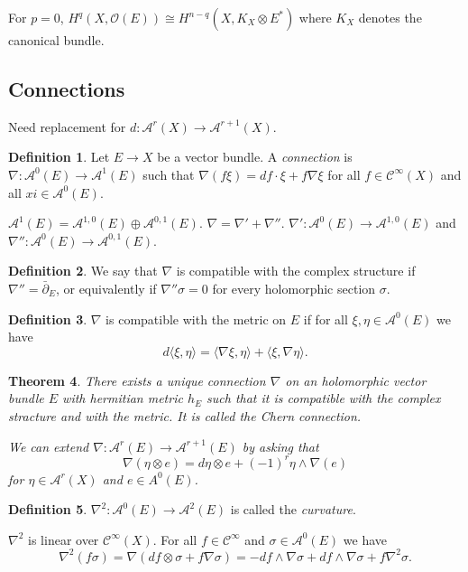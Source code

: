 \documentclass[11pt,A4]{article}
\theoremstyle{plain}
\newtheorem{thm}{Theorem}[section]
\theoremstyle{definition}
\newtheorem{defn}[thm]{Definition}
\theoremstyle{remark}
\newcommand{\1}{\mathbbm{1}}
\newcommand{\A}{\mathscr{A}}
\newcommand{\calC}{\mathcal{C}}
\renewcommand{\O}{\mathcal{O}}
\newcommand{\ot}{\otimes}
\newcommand{\op}{\oplus}
\begin{document}
For $p=0$, $H^{q}(X,\O(E))\cong H^{n-q}(X,K_{X}\ot E^{*})$ where $K_{X}$ denotes the canonical bundle.

\subsection{Connections}

Need replacement for $d\colon \A^{r}(X)\to \A^{r+1}(X)$.

\begin{defn}
    Let $E\to X$ be a vector bundle.
    A \textit{connection} is $\nabla \colon \A^{0}(E)\to \A^{1}(E)$ such that $\nabla(f\xi)=df\cdot \xi + f\nabla \xi$ for all $f\in \calC^{\infty}(X)$ and all $xi\in \A^{0}(E)$.
\end{defn}

$\A^{1}(E)=\A^{1,0}(E)\op \A^{0,1}(E)$.
$\nabla =\nabla'+ \nabla''$.
$\nabla'\colon \A^{0}(E)\to \A^{1,0}(E)$ and $\nabla''\colon \A^{0}(E)\to \A^{0,1}(E)$.

\begin{defn}
    We say that $\nabla $ is compatible with the complex structure if $\nabla''=\bar{\partial}_{E}$, or equivalently if $\nabla''\sigma=0$ for every holomorphic section $\sigma$.
\end{defn}

\begin{defn}
    $\nabla$ is compatible with the metric on $E$ if for all $\xi,\eta\in \A^{0}(E)$ we have
    \[ d\langle \xi ,\eta \rangle =\langle \nabla \xi ,\eta\rangle + \langle \xi,\nabla\eta \rangle.\]
\end{defn}

\begin{thm}
    There exists a unique connection $\nabla$ on an holomorphic vector bundle $E$ with hermitian metric $h_{E}$ such that it is compatible with the complex stracture and with the metric.
    It is called the \textit{Chern connection}.

    We can extend $\nabla \colon \A^{r}(E)\to \A^{r+1}(E)$ by asking that
    \[ \nabla(\eta\ot e)=d\eta \ot e+(-1)^{r}\eta \wedge \nabla(e) \]
    for $\eta \in \A^{r}(X)$ and $e\in A^{0}(E)$.
\end{thm}

\begin{defn}
    $\nabla^{2}\colon \A^{0}(E)\to \A^{2}(E)$ is called the \textit{curvature}.
\end{defn}

$\nabla^{2}$ is linear over $\calC^{\infty}(X)$.
For all $f\in \calC^{\infty}$ and $\sigma \in \A^{0}(E)$ we have
\[ \nabla^{2}(f\sigma)=\nabla(df\ot \sigma + f\nabla \sigma)=-df\wedge \nabla\sigma +df\wedge \nabla \sigma +f\nabla^{2}\sigma.\]
\end{document}
